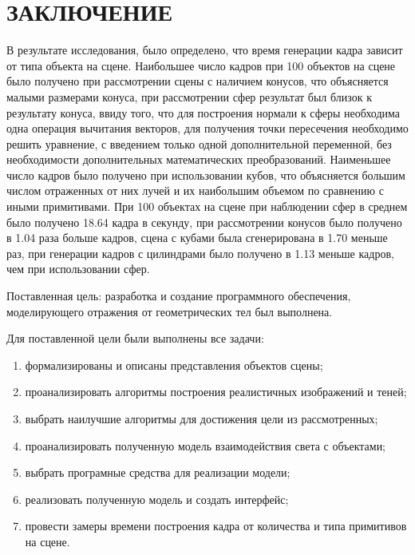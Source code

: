 \chapter*{\hfill{\centering  ЗАКЛЮЧЕНИЕ}\hfill}

В результате исследования, было определено, что время генерации кадра зависит от типа объекта на сцене. Наибольшее число кадров при 100 объектов на сцене было получено при рассмотрении сцены с наличием конусов, что объясняется малыми размерами конуса, при рассмотрении сфер результат был близок к результату конуса, ввиду того, что для построения нормали к сферы необходима одна операция вычитания векторов, для получения точки пересечения необходимо решить уравнение, с введением только одной дополнительной переменной, без необходимости дополнительных математических преобразований. Наименьшее число кадров было получено
при использовании кубов, что объясняется большим числом отраженных от них лучей и их наибольшим объемом по сравнению с иными примитивами. При 100 объектах на сцене при наблюдении сфер в среднем было получено 18.64 кадра в секунду, при рассмотрении конусов было получено в 1.04 раза больше кадров, сцена с кубами была сгенерирована  в 1.70 меньше раз, при генерации кадров с цилиндрами было получено  в 1.13 меньше кадров, чем при использовании сфер.

Поставленная цель: разработка и создание программного обеспечения, моделирующего отражения от геометрических тел был выполнена.

Для поставленной цели были выполнены все задачи:
\begin{enumerate}
	\item формализированы и описаны представления объектов сцены;
	\item проанализировать алгоритмы построения реалистичных изображений и теней;
	\item выбрать наилучшие алгоритмы для достижения цели  из рассмотренных;
	\item проанализировать полученную  модель взаимодействия света с объектами;
	\item выбрать програмные средства для реализации модели;
	\item реализовать полученную модель и создать интерфейс;
	\item провести замеры времени построения кадра от количества и типа примитивов на сцене.
\end{enumerate}